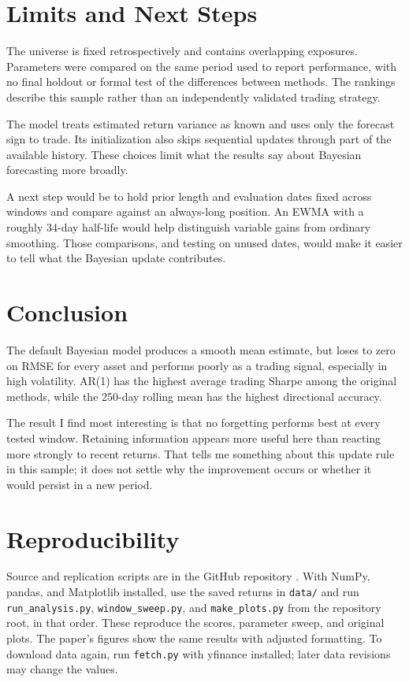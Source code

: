 \documentclass[conference]{IEEEtran}
\begin{document}
\section{Limits and Next Steps}
\balance
The universe is fixed retrospectively and contains overlapping exposures. Parameters were compared on the same period used to report performance, with no final holdout or formal test of the differences between methods. The rankings describe this sample rather than an independently validated trading strategy.

The model treats estimated return variance as known and uses only the forecast sign to trade. Its initialization also skips sequential updates through part of the available history. These choices limit what the results say about Bayesian forecasting more broadly.

A next step would be to hold prior length and evaluation dates fixed across windows and compare against an always-long position. An EWMA with a roughly 34-day half-life would help distinguish variable gains from ordinary smoothing. Those comparisons, and testing on unused dates, would make it easier to tell what the Bayesian update contributes.

\section{Conclusion}
The default Bayesian model produces a smooth mean estimate, but loses to zero on RMSE for every asset and performs poorly as a trading signal, especially in high volatility. AR(1) has the highest average trading Sharpe among the original methods, while the 250-day rolling mean has the highest directional accuracy.

The result I find most interesting is that no forgetting performs best at every tested window. Retaining information appears more useful here than reacting more strongly to recent returns. That tells me something about this update rule in this sample; it does not settle why the improvement occurs or whether it would persist in a new period.

\section*{Reproducibility}
Source and replication scripts are in the GitHub repository \cite{repository}. With NumPy, pandas, and Matplotlib installed, use the saved returns in \texttt{data/} and run \texttt{run\_analysis.py}, \texttt{window\_sweep.py}, and \texttt{make\_plots.py} from the repository root, in that order. These reproduce the scores, parameter sweep, and original plots. The paper's figures show the same results with adjusted formatting. To download data again, run \texttt{fetch.py} with yfinance installed; later data revisions may change the values.
\end{document}
